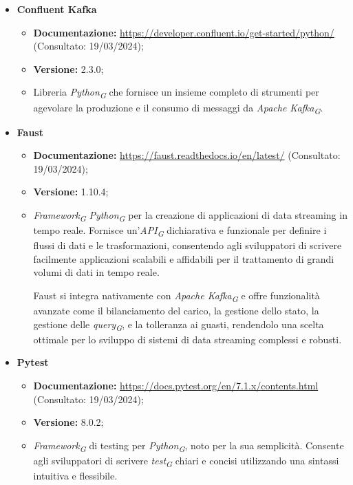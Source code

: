 \begin{itemize}
    \item \textbf{Confluent Kafka}
    \begin{itemize}
        \item \textbf{Documentazione:} \url{https://developer.confluent.io/get-started/python/} (Consultato: 19/03/2024);
        \item \textbf{Versione:} 2.3.0;
        \item Libreria \textit{Python}\textsubscript{\textit{G}} che fornisce un insieme completo di strumenti per agevolare la produzione e il consumo di messaggi da \textit{Apache Kafka}\textsubscript{\textit{G}}.
    \end{itemize}
    
    \item \textbf{Faust}
    \begin{itemize}
        \item \textbf{Documentazione:} \url{https://faust.readthedocs.io/en/latest/} (Consultato: 19/03/2024);
        \item \textbf{Versione:} 1.10.4;
        \item \textit{Framework}\textsubscript{\textit{G}} \textit{Python}\textsubscript{\textit{G}} per la creazione di applicazioni di data streaming in tempo reale. Fornisce un'\textit{API}\textsubscript{\textit{G}} dichiarativa e funzionale per definire i flussi di dati e le trasformazioni, consentendo agli sviluppatori di scrivere facilmente applicazioni scalabili e affidabili per il trattamento di grandi volumi di dati in tempo reale.
        
        Faust si integra nativamente con \textit{Apache Kafka}\textsubscript{\textit{G}} e offre funzionalità avanzate come il bilanciamento del carico, la gestione dello stato, la gestione delle \textit{query}\textsubscript{\textit{G}}, e la tolleranza ai guasti, rendendolo una scelta ottimale per lo sviluppo di sistemi di data streaming complessi e robusti.
    \end{itemize}
    
    \item \textbf{Pytest}
    \begin{itemize}
        \item \textbf{Documentazione:} \url{https://docs.pytest.org/en/7.1.x/contents.html} (Consultato: 19/03/2024);
        \item \textbf{Versione:} 8.0.2;
        \item \textit{Framework}\textsubscript{\textit{G}} di testing per \textit{Python}\textsubscript{\textit{G}}, noto per la sua semplicità. Consente agli sviluppatori di scrivere \textit{test}\textsubscript{\textit{G}} chiari e concisi utilizzando una sintassi intuitiva e flessibile.
        

\end{itemize}
\end{itemize}
